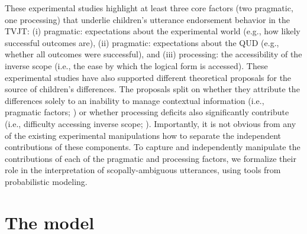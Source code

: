 \documentclass[10pt,a4paper]{article}
\begin{document}
These experimental studies highlight at least three core factors (two pragmatic, one processing) that  underlie children's utterance endorsement behavior in the TVJT:  
(i)  pragmatic: expectations about the experimental world (e.g., how likely successful outcomes are),
(ii) pragmatic: expectations about the QUD (e.g., 
whether all
outcomes were successful), and
(iii) processing: the accessibility of the inverse scope (i.e., the ease by which the logical form is accessed). 
These experimental studies have also supported different theoretical proposals for the source of children's differences. The proposals split on whether they attribute the differences solely to an inability to manage contextual information (i.e., pragmatic factors; ) or whether processing deficits also significantly contribute (i.e., difficulty accessing inverse scope; ). Importantly, it is not obvious from any of the existing experimental manipulations how to separate the independent contributions of these components. To capture and independently manipulate the contributions of each of the pragmatic and processing factors, we formalize their role in the interpretation of scopally-ambiguous utterances, using tools from probabilistic modeling.



\section{The model}

\end{document}
